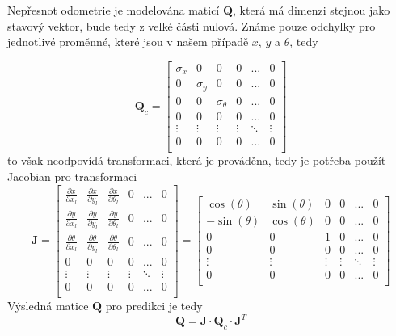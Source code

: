 \documentclass[a4paper,12pt]{article}
\begin{document}
Nepřesnot odometrie je modelována maticí $\mathbf Q$, která má dimenzi stejnou jako stavový vektor, bude tedy z velké části nulová. Známe pouze odchylky pro jednotlivé proměnné, které jsou v našem případě $x$, $y$ a $\theta$, tedy

\begin{equation}
    \mathbf Q_c = \begin{bmatrix}
        \sigma_{x} & 0 & 0 & 0 & ... & 0\\
        0 & \sigma_{y} & 0 & 0 & ... & 0 \\
        0 & 0 & \sigma_{\theta} & 0 & ... & 0\\
        0 & 0 & 0 & 0 & ... & 0\\
        \vdots & \vdots & \vdots & \vdots & \ddots & \vdots \\
        0 & 0 & 0 & 0 & ... & 0\\
    \end{bmatrix}
\end{equation}
to však neodpovídá transformaci, která je prováděna, tedy je potřeba použít Jacobian pro transformaci
\begin{equation}
    \mathbf J = \begin{bmatrix}
        \frac{\partial x}{\partial x_l} & \frac{\partial x}{\partial y_l} & \frac{\partial x}{\partial \theta_l} & 0 & ... & 0\\
        \frac{\partial y}{\partial x_l} & \frac{\partial y}{\partial y_l} & \frac{\partial y}{\partial \theta_l} & 0 & ... & 0\\
        \frac{\partial \theta}{\partial x_l} & \frac{\partial \theta}{\partial y_l} & \frac{\partial \theta}{\partial \theta_l} & 0 & ... & 0\\
        0 & 0 & 0 & 0 & ... & 0\\
        \vdots & \vdots & \vdots & \vdots & \ddots & \vdots \\
        0 & 0 & 0 & 0 & ... & 0\\
    \end{bmatrix} = \begin{bmatrix}
        \cos(\theta) & \sin(\theta) & 0 & 0 & ... & 0\\
        -\sin(\theta) & \cos(\theta) & 0 & 0 & ... & 0\\
        0 & 0 & 1 & 0 & ... & 0\\
        0 & 0 & 0 & 0 & ... & 0\\
        \vdots & \vdots & \vdots & \vdots & \ddots & \vdots \\
        0 & 0 & 0 & 0 & ... & 0\\
    \end{bmatrix}
\end{equation}
Výsledná matice $ \mathbf Q$ pro predikci je tedy
\begin{equation}
    \mathbf Q = \mathbf J \cdot \mathbf Q_c \cdot \mathbf J^T
\end{equation}
\end{document}

